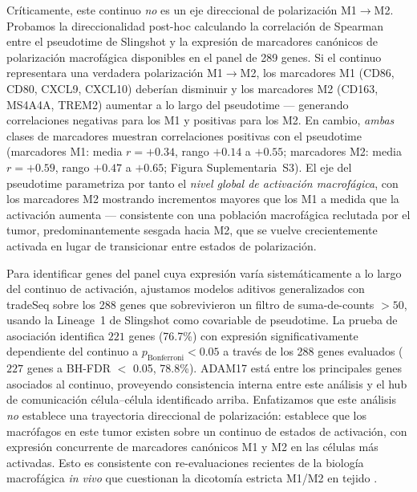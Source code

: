 \documentclass[12pt,a4paper]{article}
\begin{document}
Críticamente, este continuo \emph{no} es un eje direccional de polarización M1$\to$M2. Probamos la direccionalidad post-hoc calculando la correlación de Spearman entre el pseudotime de Slingshot y la expresión de marcadores canónicos de polarización macrofágica disponibles en el panel de 289 genes. Si el continuo representara una verdadera polarización M1$\to$M2, los marcadores M1 (CD86, CD80, CXCL9, CXCL10) deberían disminuir y los marcadores M2 (CD163, MS4A4A, TREM2) aumentar a lo largo del pseudotime --- generando correlaciones negativas para los M1 y positivas para los M2. En cambio, \emph{ambas} clases de marcadores muestran correlaciones positivas con el pseudotime (marcadores M1: media $r = +0.34$, rango $+0.14$ a $+0.55$; marcadores M2: media $r = +0.59$, rango $+0.47$ a $+0.65$; Figura Suplementaria~S3). El eje del pseudotime parametriza por tanto el \emph{nivel global de activación macrofágica}, con los marcadores M2 mostrando incrementos mayores que los M1 a medida que la activación aumenta --- consistente con una población macrofágica reclutada por el tumor, predominantemente sesgada hacia M2, que se vuelve crecientemente activada en lugar de transicionar entre estados de polarización.

Para identificar genes del panel cuya expresión varía sistemáticamente a lo largo del continuo de activación, ajustamos modelos aditivos generalizados con tradeSeq sobre los 288 genes que sobrevivieron un filtro de suma-de-counts $>50$, usando la Lineage~1 de Slingshot como covariable de pseudotime. La prueba de asociación identifica $221$ genes (76.7\%) con expresión significativamente dependiente del continuo a $p_{\text{Bonferroni}} < 0.05$ a través de los 288 genes evaluados ($227$ genes a BH-FDR $<$ 0.05, 78.8\%). ADAM17 está entre los principales genes asociados al continuo, proveyendo consistencia interna entre este análisis y el hub de comunicación célula--célula identificado arriba. Enfatizamos que este análisis \emph{no} establece una trayectoria direccional de polarización: establece que los macrófagos en este tumor existen sobre un continuo de estados de activación, con expresión concurrente de marcadores canónicos M1 y M2 en las células más activadas. Esto es consistente con re-evaluaciones recientes de la biología macrofágica \emph{in vivo} que cuestionan la dicotomía estricta M1/M2 en tejido \citep{mantovani2022macrophage}.
\end{document}
